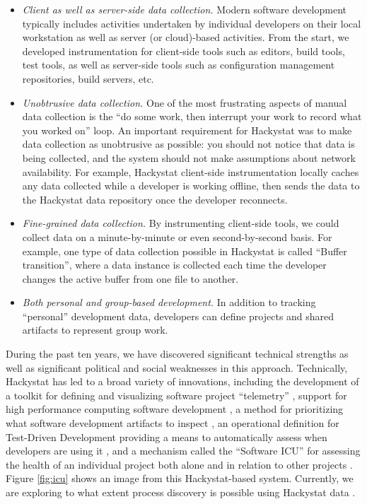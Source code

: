 \documentclass[]{article}
\begin{document}
\begin{itemize}
\item {\em Client as well as server-side data collection.}  Modern software development
  typically includes activities undertaken by individual developers on their local
  workstation as well as server (or cloud)-based activities. From the start, we developed
  instrumentation for client-side tools such as editors, build tools, test tools, as well
  as server-side tools such as configuration management repositories, build servers, etc.
\item {\em Unobtrusive data collection.}  One of the most frustrating aspects of manual data
  collection is the ``do some work, then interrupt your work to record what you worked on''
  loop. An important requirement for Hackystat was to make data collection as unobtrusive
  as possible: you should not notice that data is being collected, and the system should
  not make assumptions about network availability. For example, Hackystat client-side
  instrumentation locally caches any data collected while a developer is working
  offline, then sends the data to the Hackystat data repository once the developer
  reconnects. 
\item {\em Fine-grained data collection.}  By instrumenting client-side tools, we could
  collect data on a minute-by-minute or even second-by-second basis. For example, one type
  of data collection possible in Hackystat is called ``Buffer transition'', where a data
  instance is collected each time the developer changes the active buffer from one file to
  another.
\item {\em Both personal and group-based development.}  In addition to tracking ``personal''
  development data, developers can define projects
  and shared artifacts to represent group work.  
\end{itemize}

During the past ten years, we have discovered significant technical strengths as well as
significant political and social weaknesses in this approach.  Technically, Hackystat has
led to a broad variety of innovations, including the development of a toolkit for defining
and visualizing software project ``telemetry'' \cite{csdl2-04-11}, support for high
performance computing software development \cite{csdl2-04-22}, a method for prioritizing
what software development artifacts to inspect \cite{csdl2-05-01}, an operational
definition for Test-Driven Development providing a means to automatically assess when
developers are using it \cite{csdl2-09-01}, and a mechanism called the ``Software
ICU'' for assessing the health of an individual project both alone and in
relation to other projects \cite{csdl2-09-02}.  Figure \ref{fig:icu} shows an image from
this Hackystat-based system. Currently, we are exploring to what extent process discovery
is possible using Hackystat data \cite{csdl2-10-09}.
\end{document}
